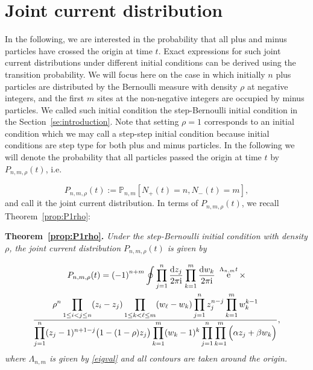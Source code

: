 \documentclass[cmp]{svjour}
\numberwithin{theorem}{section}
\numberwithin{equation}{section}
\DeclareMathOperator{\e}{e}
\def\dd{{\rm d}}
\def\ii{{\rm i}}
\begin{document}
\section{Joint current distribution}
\label{se:joint current}
In the following, we are interested in the probability that all plus and minus particles have crossed the origin at time $t$. Exact expressions for such joint current distributions under different initial conditions can be derived using the transition probability. We will focus here on the case in which initially $n$ plus particles are distributed by the Bernoulli measure with density $\rho$ at negative integers, and the first $m$ sites at the non-negative integers are occupied by minus particles. We called such initial condition the step-Bernoulli initial condition in the Section~\ref{se:introduction}. Note that setting $\rho= 1$ corresponds to an initial condition which we may call  a step-step initial condition because initial conditions are step type for both plus and minus particles. In the following we will denote the probability that all particles passed the origin at time $t$ by $P_{n,m,\rho}(t)$, i.e.

\begin{equation}
    P_{n,m,\rho}(t) := \mathbb{P}_{n,m}[N_{+}(t)=n, N_{-}(t)=m],
\end{equation}
and call it the joint current distribution. In terms of $P_{n,m,\rho}(t)$, we recall  Theorem~\ref{prop:P1rho}:


\medskip

\noindent\textbf{Theorem~\ref{prop:P1rho}.}
\textit{Under the step-Bernoulli initial condition with density $\rho$, the joint current distribution $P_{n,m,\rho}(t)$ is given by}


\begin{multline}
P_{n,m,\rho}(t)
={(-1)}^{n+m} \oint \prod_{j=1}^n \frac{\dd z_j }{2\pi \ii} \prod_{k=1}^m
\frac{\dd w_k }{2\pi \ii}\ \e^{\Lambda_{n,m} t} \times \\
\frac{\displaystyle \rho^n \prod_{1\le i<j\le n} (z_i-z_j) \prod_{1\le k< \ell \le m} (w_\ell -w_k) \prod_{j=1}^n z_j^{n-j} \prod_{k=1}^m w_k^{k-1}}
{\displaystyle \prod_{j=1}^n (z_j-1)^{n+1-j} \big(1-(1-\rho) z_j\big)
\prod_{k=1}^m (w_k-1)^{k} \prod_{j=1}^n \prod_{k=1}^m \Big(\alpha z_j + \beta w_k\Big)},
\label{Prho}
\end{multline}
\textit{where $\Lambda_{n,m}$ is given by \eqref{eigval} and all contours are taken around the origin.}


\medskip
\end{document}
